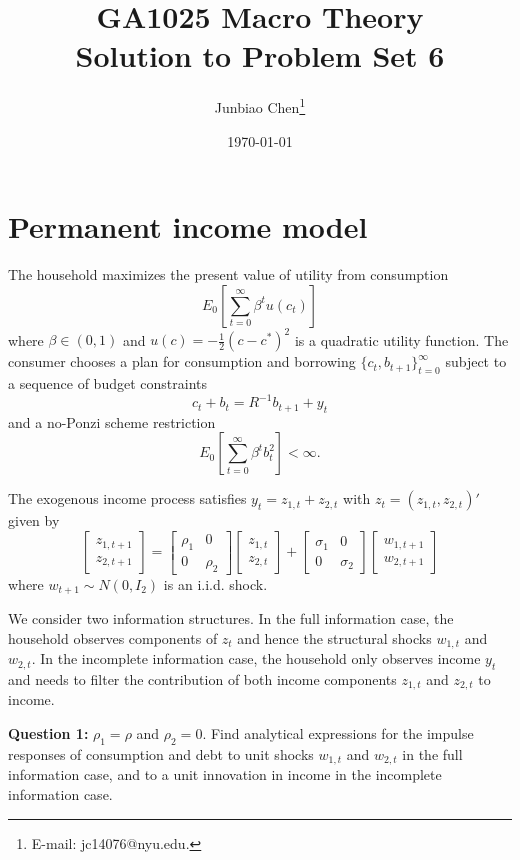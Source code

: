 \documentclass[11pt]{article}
\title{GA1025 Macro Theory \\Solution to Problem Set 6}
\author{
Junbiao Chen\thanks{E-mail: jc14076@nyu.edu.}
}
\date{\today}
\theoremstyle{definition}
\theoremstyle{boldtitle} %
\numberwithin{equation}{section}
\numberwithin{figure}{section}
\numberwithin{table}{section}
\begin{document}
\maketitle


\section{Permanent income model}
The household maximizes the present value of utility from consumption
\[
E_0 \left[ \sum_{t=0}^\infty \beta^t u(c_t) \right]
\]
where $\beta \in (0,1)$ and $u(c) = -\frac{1}{2}(c - c^*)^2$ is a quadratic utility function. The consumer chooses a plan for consumption and borrowing $\{c_t, b_{t+1}\}_{t=0}^\infty$ subject to a sequence of budget constraints
\[
c_t + b_t = R^{-1} b_{t+1} + y_t
\]
and a no-Ponzi scheme restriction
\[
E_0 \left[ \sum_{t=0}^\infty \beta^t b_t^2 \right] < \infty.
\]

The exogenous income process satisfies $y_t = z_{1,t} + z_{2,t}$ with $z_t = (z_{1,t}, z_{2,t})'$ given by
\[
\begin{bmatrix}
z_{1,t+1} \\
z_{2,t+1}
\end{bmatrix}
=
\begin{bmatrix}
\rho_1 & 0 \\
0 & \rho_2
\end{bmatrix}
\begin{bmatrix}
z_{1,t} \\
z_{2,t}
\end{bmatrix}
+
\begin{bmatrix}
\sigma_1 & 0 \\
0 & \sigma_2
\end{bmatrix}
\begin{bmatrix}
w_{1,t+1} \\
w_{2,t+1}
\end{bmatrix}
\]
where $w_{t+1} \sim N(0, I_2)$ is an i.i.d. shock.

We consider two information structures. In the full information case, the household observes components of $z_t$ and hence the structural shocks $w_{1,t}$ and $w_{2,t}$. In the incomplete information case, the household only observes income $y_t$ and needs to filter the contribution of both income components $z_{1,t}$ and $z_{2,t}$ to income.

\textbf{Question 1:}
$\rho_1 = \rho$ and $\rho_2 = 0$. 
Find analytical expressions for the impulse responses of consumption and debt 
to unit shocks $w_{1,t}$ and $w_{2,t}$ in the full information case, 
and to a unit innovation in income in the incomplete information case.
\end{document}
